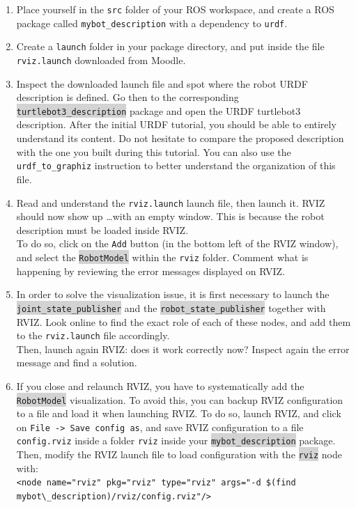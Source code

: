 \documentclass[10pt,a4paper]{upmc}
\newcounter{mainmemorder}
\newcommand{\save}{\setcounter{mainmemorder}{\value{enumi}}}
\newcommand{\load}{\setcounter{enumi}{\value{mainmemorder}}}
\newcommand{\mytext}[1]{\colorbox{lightgray}{\texttt{#1}}}
\begin{document}
\begin{enumerate}
  \load
  \item Place yourself in the \texttt{src} folder of your ROS workspace, and create a ROS package
        called \texttt{mybot\_description} with a dependency to \texttt{urdf}.

  \item Create a \texttt{launch} folder in your package directory, and put inside the file
        \texttt{rviz.launch} downloaded from Moodle.

  \item Inspect the downloaded launch file and spot where the robot URDF description is defined. Go
        then to the corresponding \mytext{turtlebot3\_description} package and open the URDF
        turtlebot3 description. After the initial URDF tutorial, you should be able to entirely
        understand its content. Do not hesitate to compare the proposed description with the one you
        built during this tutorial. You can also use the \texttt{urdf\_to\_graphiz} instruction to
        better understand the organization of this file.

  \item Read and understand the \texttt{rviz.launch} launch file, then launch it. RVIZ should now
        show up \ldots with an empty window. This is because the robot description must be loaded
        inside RVIZ. \\ To do so, click on the \texttt{Add} button (in the bottom left of the RVIZ
        window), and select the \mytext{RobotModel} within the \texttt{rviz} folder. Comment what is
        happening by reviewing the error messages displayed on RVIZ.

  \item In order to solve the visualization issue, it is first necessary to launch the
        \mytext{joint\_state\_publisher} and the \mytext{robot\_state\_publisher} together with RVIZ.
        Look online to find the exact role of each of these nodes, and add them to the        \texttt{rviz.launch} file accordingly. \\
        Then, launch again RVIZ: does it work correctly now? Inspect again the error
        message and find a solution.

  \item If you close and relaunch RVIZ, you have to systematically add the \mytext{RobotModel}
        visualization. To avoid this, you can backup RVIZ configuration to a file and load it when
        launching RVIZ. To do so, launch RVIZ, and click on \texttt{File -> Save config as}, and
        save RVIZ configuration to a file \texttt{config.rviz} inside a folder \texttt{rviz} inside
        your \mytext{mybot\_description} package. Then, modify the RVIZ launch file to load
        configuration with the \mytext{rviz} node with:\\
        \verb+<node name="rviz" pkg="rviz" type="rviz" args="-d $(find mybot\_description)/rviz/config.rviz"/>+

        \save
\end{enumerate}
\end{document}
